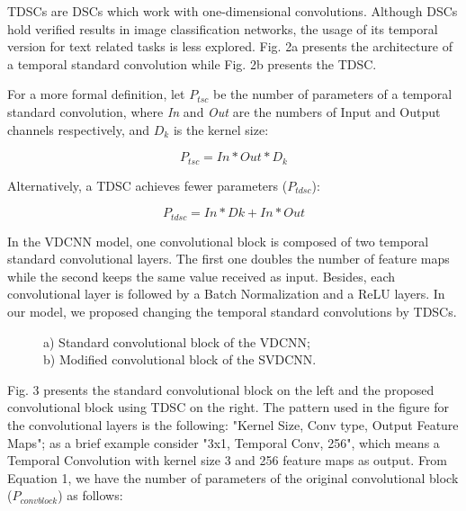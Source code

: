 \documentclass[conference]{IEEEtran}
\begin{document}
\newpage

TDSCs are DSCs which work with one-dimensional convolutions. Although DSCs hold verified results in image classification networks, the usage of its temporal version for text related tasks is less explored. Fig. 2a presents the architecture of a temporal standard convolution while Fig. 2b presents the TDSC.

For a more formal definition, let  $P_{tsc}$ be the number of parameters of a temporal standard convolution, where  \textit{In} and \textit{Out} are the numbers of Input and Output channels respectively, and $D_k$  is the kernel size:

\begin{equation}
    P_{tsc} =  In \ast Out \ast D_k
\end{equation}

Alternatively, a TDSC achieves fewer parameters ($P_{tdsc}$): 

\begin{equation}
    P_{tdsc} = In \ast Dk  + In \ast Out 
\end{equation}

In the VDCNN model, one convolutional block is composed of two temporal standard convolutional layers. The first one doubles the number of feature maps while the second keeps the same value received as input. Besides, each convolutional layer is followed by a Batch Normalization and a ReLU layers. In our model, we proposed changing the temporal standard convolutions by TDSCs.

\begin{figure}[htbp]
\begin{minipage}[t]{.5\linewidth}
\centering
{}
\end{minipage}\begin{minipage}[t]{.5\linewidth}
\centering
{}
\end{minipage}
\caption{a) Standard convolutional block of the VDCNN;\\b) Modified convolutional block of the SVDCNN.}
\label{fig:main}
\end{figure}

Fig. 3 presents the standard convolutional block on the left and the proposed convolutional block using TDSC on the right. The pattern used in the figure for the convolutional layers is the following: "Kernel Size, Conv type, Output  Feature Maps"; as a brief example consider "3x1, Temporal Conv, 256", which means a Temporal Convolution with kernel size 3 and 256 feature maps as output. From Equation 1, we have the number of parameters of the original convolutional block  ($P_{convblock}$) as follows:
\end{document}
